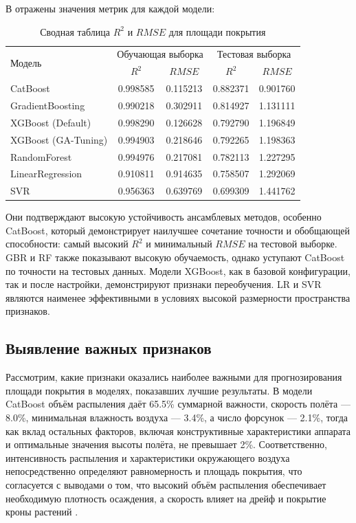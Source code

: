 В  отражены значения метрик для каждой модели:

\begin{table}[htbp!]
	\centering\small
	\caption{Сводная таблица $R^2$ и $RMSE$ для площади покрытия}
	\label{tab:coverage-table}		
	\begin{tabular}{|l|c|c|c|c|}
		\hline
		\multirow{2}{*}{Модель} & \multicolumn{2}{|c|}{Обучающая выборка} & \multicolumn{2}{c|}{Тестовая выборка}\\\cline{2-5} 
		& $R^2$ & $RMSE$ & $R^2$ & $RMSE$\\\hline
		CatBoost&0.998585&0.115213&0.882371&0.901760\\
		GradientBoosting&0.990218&0.302911&0.814927&1.131111\\
		XGBoost (Default)&0.998290&0.126628&0.792790&1.196849\\
		XGBoost (GA-Tuning)&0.994903&0.218646&0.792265&1.198363\\
		RandomForest&0.994976&0.217081&0.782113&1.227295\\
		LinearRegression&0.910811&0.914635&0.758507&1.292069\\
		SVR&0.956363&0.639769&0.699309&1.441762\\
		\hline
	\end{tabular}	
	\normalsize
\end{table}

Они подтверждают высокую устойчивость ансамблевых методов, особенно CatBoost, который демонстрирует наилучшее сочетание точности и обобщающей способности: самый высокий $R^2$ и минимальный $RMSE$ на тестовой выборке. GBR и RF также показывают высокую обучаемость, однако уступают CatBoost по точности на тестовых данных. Модели XGBoost, как в базовой конфигурации, так и после настройки, демонстрируют признаки переобучения. LR и SVR являются наименее эффективными в условиях высокой размерности пространства признаков.

\subsection{Выявление важных признаков}

Рассмотрим, какие признаки оказались наиболее важными для прогнозирования площади покрытия в моделях, показавших лучшие результаты. В модели CatBoost объём распыления даёт 65.5\% суммарной важности, скорость полёта --- 8.0\%, минимальная влажность воздуха --- 3.4\%, а число форсунок --- 2.1\%, тогда как вклад остальных факторов, включая конструктивные характеристики аппарата и оптимальные значения высоты полёта, не превышает 2\%. Соответственно, интенсивность распыления и характеристики окружающего воздуха непосредственно определяют равномерность и площадь покрытия, что согласуется с выводами о том, что высокий объём распыления обеспечивает необходимую плотность осаждения, а скорость влияет на дрейф и покрытие кроны растений \cite{Wu2025}.

